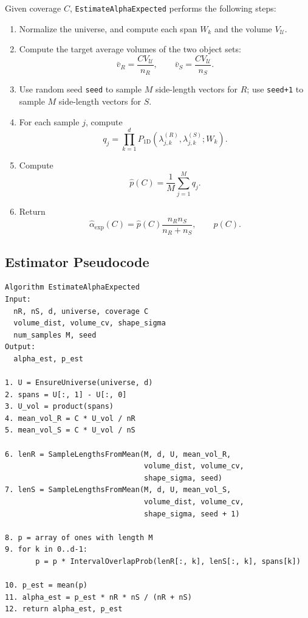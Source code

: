 \documentclass[11pt,a4paper]{article}
\newcommand{\Uset}{\mathcal{U}}
\newcommand{\code}[1]{\texttt{#1}}
\begin{document}
Given coverage $C$, \code{EstimateAlphaExpected} performs the following steps:
\begin{enumerate}
  \item Normalize the universe, and compute each span $W_k$ and the volume $V_{\Uset}$.
  \item Compute the target average volumes of the two object sets:
  \[
    \bar v_R=\frac{C V_{\Uset}}{n_R},
    \qquad
    \bar v_S=\frac{C V_{\Uset}}{n_S}.
  \]
  \item Use random seed \code{seed} to sample $M$ side-length vectors for $R$; use \code{seed+1} to sample $M$ side-length vectors for $S$.
  \item For each sample $j$, compute
  \[
    q_j=
    \prod_{k=1}^{d}
    P_{\mathrm{1D}}
    (\lambda^{(R)}_{j,k},
     \lambda^{(S)}_{j,k};W_k).
  \]
  \item Compute
  \[
    \widehat p(C)=\frac1M\sum_{j=1}^{M}q_j.
  \]
  \item Return
  \[
    \widehat\alpha_{\mathrm{exp}}(C)
    =\widehat p(C)\frac{n_Rn_S}{n_R+n_S},
    \qquad
    \widehat p(C).
  \]
\end{enumerate}

\subsection{Estimator Pseudocode}

\begin{verbatim}
Algorithm EstimateAlphaExpected
Input:
  nR, nS, d, universe, coverage C
  volume_dist, volume_cv, shape_sigma
  num_samples M, seed
Output:
  alpha_est, p_est

1. U = EnsureUniverse(universe, d)
2. spans = U[:, 1] - U[:, 0]
3. U_vol = product(spans)
4. mean_vol_R = C * U_vol / nR
5. mean_vol_S = C * U_vol / nS

6. lenR = SampleLengthsFromMean(M, d, U, mean_vol_R,
                                volume_dist, volume_cv,
                                shape_sigma, seed)
7. lenS = SampleLengthsFromMean(M, d, U, mean_vol_S,
                                volume_dist, volume_cv,
                                shape_sigma, seed + 1)

8. p = array of ones with length M
9. for k in 0..d-1:
       p = p * IntervalOverlapProb(lenR[:, k], lenS[:, k], spans[k])

10. p_est = mean(p)
11. alpha_est = p_est * nR * nS / (nR + nS)
12. return alpha_est, p_est
\end{verbatim}
\end{document}
